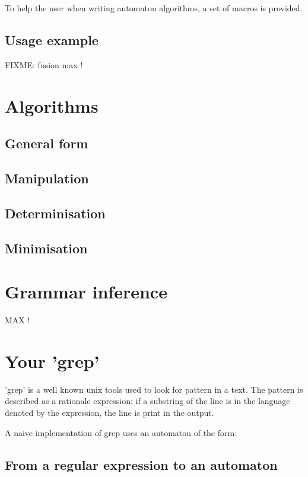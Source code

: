 \documentclass{article}
\begin{document}
To help the user when writing automaton algorithms, a set of macros is provided.

\subsection{Usage example}

FIXME: fusion max !

\section{Algorithms}

\subsection{General form}

\subsection{Manipulation}

\subsection{Determinisation}

\subsection{Minimisation}

\section{Grammar inference}

MAX !

\section{Your 'grep'}

'grep' is a well known unix tools used to look for pattern in a text. The pattern is described as a rationale expression: if a substring of the line is in the language denoted by the expression, the line is print in the output.

A naive implementation of grep uses an automaton of the form:

\subsection{From a regular expression to an automaton}
\end{document}
